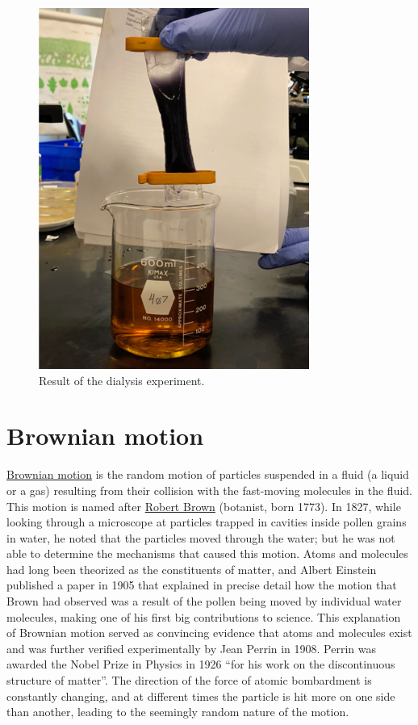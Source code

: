 \begin{figure}

{\centering \includegraphics[width=0.7\linewidth]{./figures/exchange/Dialysis} 

}

\caption{Result of the dialysis experiment.}\label{fig:dialysis}
\end{figure}

\section{Brownian motion}\label{brownian-motion}

\href{https://en.wikipedia.org/wiki/Brownian_motion}{Brownian motion} is
the random motion of particles suspended in a fluid (a liquid or a gas)
resulting from their collision with the fast-moving molecules in the
fluid. This motion is named after
\href{https://en.wikipedia.org/wiki/Robert_Brown_(botanist,_born_1773)}{Robert
Brown} (botanist, born 1773). In 1827, while looking through a
microscope at particles trapped in cavities inside pollen grains in
water, he noted that the particles moved through the water; but he was
not able to determine the mechanisms that caused this motion. Atoms and
molecules had long been theorized as the constituents of matter, and
Albert Einstein published a paper in 1905 that explained in precise
detail how the motion that Brown had observed was a result of the pollen
being moved by individual water molecules, making one of his first big
contributions to science. This explanation of Brownian motion served as
convincing evidence that atoms and molecules exist and was further
verified experimentally by Jean Perrin in 1908. Perrin was awarded the
Nobel Prize in Physics in 1926 ``for his work on the discontinuous
structure of matter''. The direction of the force of atomic bombardment
is constantly changing, and at different times the particle is hit more
on one side than another, leading to the seemingly random nature of the
motion.


